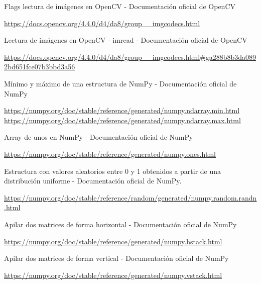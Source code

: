 \documentclass[12pt, spanish]{article}
\begin{document}
\begin{thebibliography}{9}

Flags lectura de imágenes en OpenCV - Documentación oficial de OpenCV

\url{https://docs.opencv.org/4.4.0/d4/da8/group__imgcodecs.html}

Lectura de imágenes en OpenCV - imread - Documentación oficial de OpenCV

\url{https://docs.opencv.org/4.4.0/d4/da8/group__imgcodecs.html#ga288b8b3da0892bd651fce07b3bbd3a56}

Mínimo y máximo de una estructura de NumPy - Documentación oficial de NumPy

\url{https://numpy.org/doc/stable/reference/generated/numpy.ndarray.min.html}
\url{https://numpy.org/doc/stable/reference/generated/numpy.ndarray.max.html}

Array de unos en NumPy - Documentación oficial de NumPy

\url{https://numpy.org/doc/stable/reference/generated/numpy.ones.html}

Estructura con valores aleatorios entre 0 y 1 obtenidos a partir de una distribución uniforme - Documentación oficial de NumPy.

\url{https://numpy.org/doc/stable/reference/random/generated/numpy.random.randn.html}

Apilar dos matrices de forma horizontal - Documentación oficial de NumPy

\url{https://numpy.org/doc/stable/reference/generated/numpy.hstack.html}

Apilar dos matrices de forma vertical - Documentación oficial de NumPy

\url{https://numpy.org/doc/stable/reference/generated/numpy.vstack.html}

\end{thebibliography}
\end{document}
